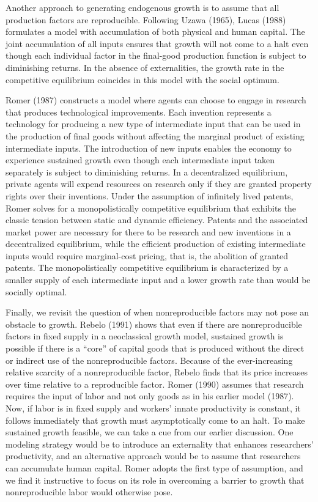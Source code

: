 Another approach to generating endogenous growth is to assume
that all production factors are reproducible. Following Uzawa (1965),
%
Lucas (1988)
%
formulates a model with accumulation of both physical
and human capital. The joint accumulation of all inputs
ensures that growth will not come to a halt
even though each individual factor in the final-good
production function is subject to
diminishing returns. In the absence of externalities,
the growth rate in the competitive equilibrium
coincides in this model with the social optimum.

Romer (1987) constructs a model where agents can choose to engage
in research that produces technological improvements.
Each invention represents a technology for
producing a new type of intermediate input that can be used in
the production of final goods without affecting the marginal product
of existing intermediate inputs. The introduction of new inputs
enables the economy to experience sustained growth even though each
intermediate
input taken separately is subject to diminishing returns.
In a decentralized equilibrium, private agents will expend
resources on research  only if they are granted property rights over
their inventions. Under the assumption of infinitely lived patents,
Romer solves for a monopolistically competitive equilibrium that
exhibits the classic tension between static and dynamic
efficiency. Patents and the associated market power are necessary for
there to be research and new inventions in a decentralized equilibrium,
while the efficient production of existing intermediate inputs would
require marginal-cost pricing, that is, the abolition of granted
patents. The monopolistically competitive equilibrium is characterized
by a smaller
supply of each intermediate input and a lower growth rate than would be
socially optimal.

Finally, we revisit the question of when nonreproducible factors may not
pose an obstacle to growth. Rebelo (1991)
%
shows that even if there are nonreproducible factors in fixed supply in
a neoclassical growth model, sustained growth is possible if there is
a ``core'' of capital goods that is produced without the direct or
indirect use of the nonreproducible factors.  Because of
the ever-increasing relative scarcity of a nonreproducible factor,
Rebelo finds that its price increases over time relative to a
reproducible factor.
Romer (1990) assumes that research requires the input of labor
and not only goods as in his earlier model (1987). Now, if labor is in fixed
supply and workers' innate productivity is constant, it follows immediately
that growth must asymptotically come to an halt.  To make sustained growth
feasible, we can take a cue from our earlier discussion.
One modeling strategy would be to introduce an externality that enhances
researchers' productivity, and an alternative approach would be to assume
that researchers can accumulate human capital. Romer adopts the first type
of assumption, and we find it instructive to focus
on its role in overcoming a barrier to growth that nonreproducible labor
would otherwise pose.

